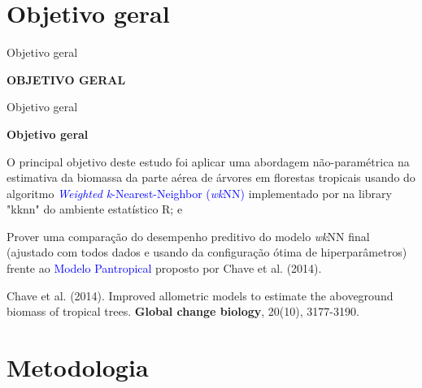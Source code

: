 \documentclass[12pt,ignorenonframetext,aspectratio=1610]{beamer}
\begin{document}

\section{Objetivo geral}
\begin{frame}[c]{Objetivo geral}
	\transwipe
	\begin{center}
		{\Large \textbf{OBJETIVO GERAL}}
	\end{center}
	
\end{frame}

\begin{frame}[c]{Objetivo geral}

\transwipe
\justifying

\textbf{Objetivo geral} \newline

O principal objetivo deste estudo foi aplicar uma abordagem não-paramétrica na estimativa da biomassa da parte aérea de árvores em florestas tropicais usando do algoritmo \textcolor{blue}{\textit{Weighted k}-Nearest-Neighbor (\textit{wk}NN)} implementado por  na library "kknn" do ambiente estatístico R; e \newline

Prover uma comparação do desempenho preditivo do modelo \textit{wk}NN final (ajustado com todos dados e usando da configuração ótima de hiperparâmetros) frente ao \textcolor{blue}{Modelo Pantropical} proposto por Chave et al. (2014). \newline \newline


{\scriptsize Chave et al. (2014). Improved allometric models to estimate the aboveground biomass of tropical trees. \textbf{Global change biology}, 20(10), 3177-3190.}

\end{frame}

\section{Metodologia}
\end{document}
